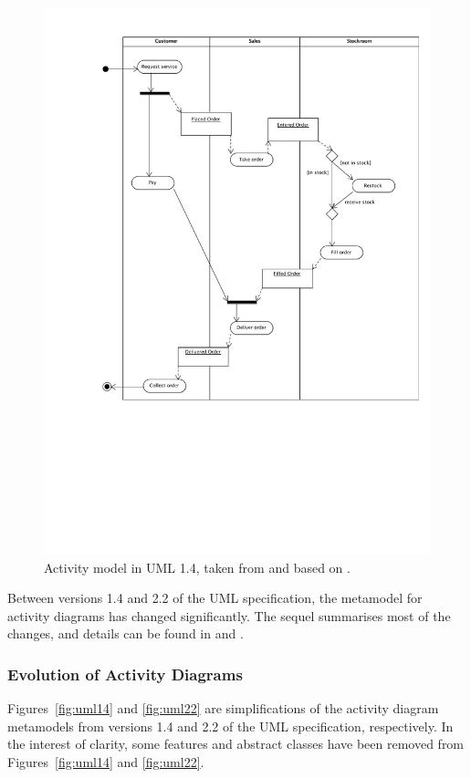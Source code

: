 \begin{figure}[htbp]
  \centering
  \includegraphics*[viewport=75 230 585 800,width=13cm]{6.Evaluation/images/activity.pdf}
  \caption[Activity model in UML 1.4.]{Activity model in UML 1.4, taken from \cite{rose10ttc_case} and based on \cite[pg3-165]{uml14}.}
  \label{fig:activity}
\end{figure}

Between versions 1.4 and 2.2 of the UML specification, the metamodel for activity diagrams has changed significantly. The sequel summarises most of the changes, and details can be found in \cite{uml14} and \cite{uml22}.

\subsubsection{Evolution of Activity Diagrams}
Figures~\ref{fig:uml14} and \ref{fig:uml22} are simplifications of the activity diagram metamodels from versions 1.4 and 2.2 of the UML specification, respectively. In the interest of clarity, some features and abstract classes have been removed from Figures~\ref{fig:uml14} and \ref{fig:uml22}.

